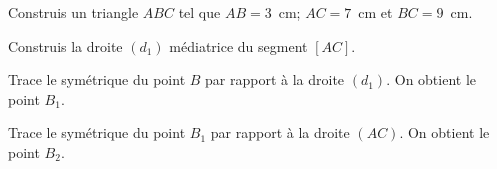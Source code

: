\begin{myenumerate}
  \item Construis un triangle $ABC$ tel que $AB=3$~cm; $AC=7$~cm et $BC=9$~cm.
  \item Construis la droite $(d_1)$ médiatrice du segment $[AC]$.
  \item Trace le symétrique du point $B$ par rapport à la droite
    $(d_1)$. On obtient le point $B_1$.
  \item Trace le symétrique du point $B_1$ par rapport à la droite
    $(AC)$. On obtient le point $B_2$.
\end{myenumerate}